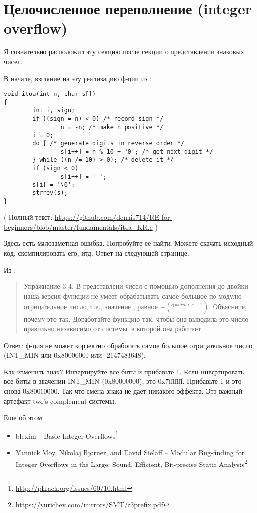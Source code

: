 \section{Целочисленное переполнение (integer overflow)}

Я сознательно расположил эту секцию после секции о представлении знаковых чисел.

В начале, взгляние на эту реализацию ф-ции  из \InSqBrackets{\KRBook}:

\begin{lstlisting}[style=customc]
void itoa(int n, char s[])
{
        int i, sign;
        if ((sign = n) < 0) /* record sign */
                n = -n; /* make n positive */
        i = 0;
        do { /* generate digits in reverse order */
                s[i++] = n % 10 + '0'; /* get next digit */
        } while ((n /= 10) > 0); /* delete it */
        if (sign < 0)
                s[i++] = '-';
        s[i] = '\0';
        strrev(s);
}
\end{lstlisting}

( Полный текст: \url{https://github.com/dennis714/RE-for-beginners/blob/master/fundamentals/itoa_KR.c} )

Здесь есть малозаметная ошибка. Попробуйте её найти. Можете скачать исходный код, скомпилировать его, итд.
Ответ на следующей странице.

\clearpage

Из \InSqBrackets{\KRBook}:

\begin{framed}
\begin{quotation}
Упражнение 3-4. В представлени чисел с помощью дополнения до двойки наша версия функции 
не умеет обрабатывать самое большое по модулю отрицательное число, т.е., значение 
, равное $-(2^{wordsize-1})$. Объясните, почему это так. Доработайте функцию так, чтобы она
выводила это число правильно независимо от системы, в которой она работает.
\end{quotation}
\end{framed}

Ответ: ф-ция не может корректно обработать самое большое отрицательное число (INT\_MIN или 0x80000000 или -2147483648).

Как изменить знак? Инвертируйте все биты и прибавьте 1.
Если инвертировать все биты в значении INT\_MIN (0x80000000), это 0x7fffffff. Прибавьте 1 и это снова 0x80000000.
Так что смена знака не дает никакого эффекта.
Это важный артефакт two's complement-системы.

Еще об этом:

\begin{itemize}
\item blexim -- Basic Integer Overflows\footnote{\url{http://phrack.org/issues/60/10.html}}

\item Yannick Moy, Nikolaj Bjørner, and David Sielaff -- Modular Bug-finding for Integer Overflows in the Large: Sound, Efficient, Bit-precise Static Analysis\footnote{\url{https://yurichev.com/mirrors/SMT/z3prefix.pdf}}
\end{itemize}

